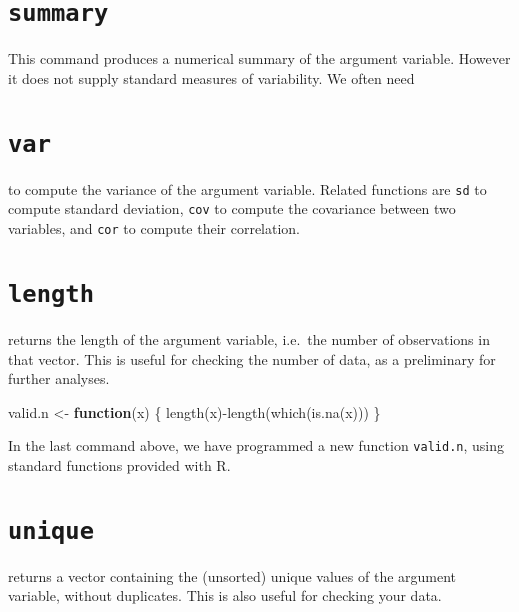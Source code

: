 \documentclass[
]{book}
\newenvironment{Shaded}{\begin{snugshade}}{\end{snugshade}}
\newcommand{\ControlFlowTok}[1]{\textcolor[rgb]{0.13,0.29,0.53}{\textbf{#1}}}
\newcommand{\FunctionTok}[1]{\textcolor[rgb]{0.00,0.00,0.00}{#1}}
\newcommand{\NormalTok}[1]{#1}
\newcommand{\OtherTok}[1]{\textcolor[rgb]{0.56,0.35,0.01}{#1}}
\newcommand{\SpecialCharTok}[1]{\textcolor[rgb]{0.00,0.00,0.00}{#1}}
\begin{document}
\hypertarget{summary-1}{%
\section{\texorpdfstring{\texttt{summary}}{summary}}\label{summary-1}}

This command produces a numerical summary of the argument variable.
However it does not supply standard measures of variability. We
often need

\hypertarget{var}{%
\section{\texorpdfstring{\texttt{var}}{var}}\label{var}}

to compute the variance of the argument variable. Related functions
are \texttt{sd} to compute standard deviation,
\texttt{cov} to compute the covariance between two
variables, and \texttt{cor} to compute their
correlation.

\hypertarget{length}{%
\section{\texorpdfstring{\texttt{length}}{length}}\label{length}}

returns the length of the argument variable, i.e.~the number of
observations in that vector. This is useful for checking the number
of data, as a preliminary for further analyses.

\begin{Shaded}
\begin{Highlighting}[]
\NormalTok{valid.n }\OtherTok{\textless{}{-}} \ControlFlowTok{function}\NormalTok{(x) \{ }
  \FunctionTok{length}\NormalTok{(x)}\SpecialCharTok{{-}}\FunctionTok{length}\NormalTok{(}\FunctionTok{which}\NormalTok{(}\FunctionTok{is.na}\NormalTok{(x))) }
\NormalTok{  \}}
\end{Highlighting}
\end{Shaded}

In the last command above, we have programmed a new function
\texttt{valid.n}, using standard functions provided
with R.

\hypertarget{unique}{%
\section{\texorpdfstring{\texttt{unique}}{unique}}\label{unique}}

returns a vector containing the (unsorted) unique values of the
argument variable, without duplicates. This is also useful for
checking your data.
\end{document}
